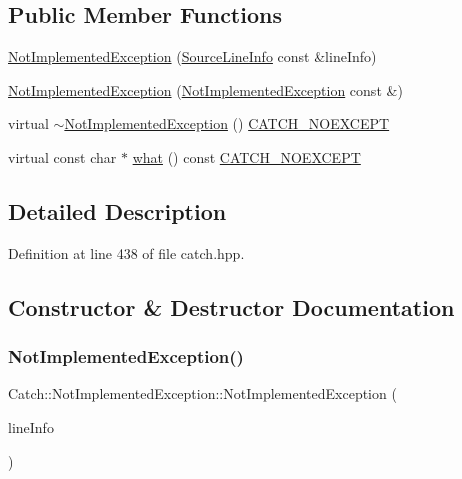 \subsection*{Public Member Functions}
\begin{DoxyCompactItemize}
\item 
\hyperlink{class_catch_1_1_not_implemented_exception_ab4f0a5c39d8ffb72c664e2c07e180634}{Not\+Implemented\+Exception} (\hyperlink{struct_catch_1_1_source_line_info}{Source\+Line\+Info} const \&line\+Info)
\item 
\hyperlink{class_catch_1_1_not_implemented_exception_a508a7a833455da2d3c10ea1a9d45e982}{Not\+Implemented\+Exception} (\hyperlink{class_catch_1_1_not_implemented_exception}{Not\+Implemented\+Exception} const \&)
\item 
virtual \hyperlink{class_catch_1_1_not_implemented_exception_a557e7312aaa32c37bded019f2b059bcb}{$\sim$\+Not\+Implemented\+Exception} () \hyperlink{catch_8hpp_a0408e94ca73880d41f38852b68eadb3c}{C\+A\+T\+C\+H\+\_\+\+N\+O\+E\+X\+C\+E\+PT}
\item 
virtual const char $\ast$ \hyperlink{class_catch_1_1_not_implemented_exception_ad4c13963f1a8feacda0cd331adda89e3}{what} () const \hyperlink{catch_8hpp_a0408e94ca73880d41f38852b68eadb3c}{C\+A\+T\+C\+H\+\_\+\+N\+O\+E\+X\+C\+E\+PT}
\end{DoxyCompactItemize}


\subsection{Detailed Description}


Definition at line 438 of file catch.\+hpp.



\subsection{Constructor \& Destructor Documentation}
\hypertarget{class_catch_1_1_not_implemented_exception_ab4f0a5c39d8ffb72c664e2c07e180634}{}\label{class_catch_1_1_not_implemented_exception_ab4f0a5c39d8ffb72c664e2c07e180634} 
\subsubsection{\texorpdfstring{Not\+Implemented\+Exception()}{NotImplementedException()}\hspace{0.1cm}{\footnotesize\ttfamily [1/2]}}
{\footnotesize\ttfamily Catch\+::\+Not\+Implemented\+Exception\+::\+Not\+Implemented\+Exception (\begin{DoxyParamCaption}\item[{\hyperlink{struct_catch_1_1_source_line_info}{Source\+Line\+Info} const \&}]{line\+Info }\end{DoxyParamCaption})}

